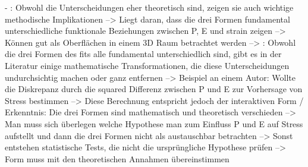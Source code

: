 - \cite[S. 5]{edwards:1990}: Obwohl die Unterscheidungen eher theoretisch sind, zeigen sie auch wichtige methodische Implikationen --> Liegt daran, dass die drei Formen fundamental unterschiedliche funktionale Beziehungen zwischen P, E und strain zeigen --> Können gut als Oberflächen in einem 3D Raum betrachtet werden --> \cite[S. 7]{edwards:1990}: Obwohl die drei Formen des fits alle fundamental unterschiedlich sind, gibt es in der Literatur einige mathematische Transformationen, die diese Unterscheidungen undurchsichtig machen oder ganz entfernen --> Beispiel an einem Autor: Wollte die Diskrepanz durch die squared Differenz zwischen P und E zur Vorhersage von Stress bestimmen --> Diese Berechnung entspricht jedoch der interaktiven Form / Erkenntnis: Die drei Formen sind mathematisch und theoretisch verschieden --> Man muss sich überlegen welche Hypothese man zum Einfluss P und E auf Stress aufstellt und dann die drei Formen nicht als austauschbar betrachten --> Sonst entstehen statistische Tests, die nicht die ursprüngliche Hypothese prüfen --> Form muss mit den theoretischen Annahmen übereinstimmen \\

\newpage
